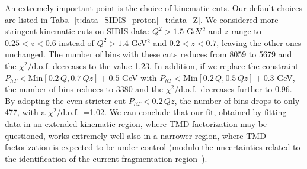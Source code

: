 \documentclass[aps,preprintnumbers,showpacs,nofootinbib,superscriptaddress,floatfix]{revtex4}
\newcommand{\AS}[1]{{\textcolor[rgb]{1,0,1}{#1}}}
\newcommand{\compass}{\textsc{Compass}}
\begin{document}
An extremely important point is the choice of kinematic cuts. Our default
choices are listed in Tabs.~\ref{t:data_SIDIS_proton}--\ref{t:data_Z}. We
considered more stringent kinematic cuts on SIDIS data: 
$Q^2 > 1.5$ GeV$^2$ and $z$ range to 
$0.25 < z < 0.6$ instead of $Q^2 > 1.4$ GeV$^2$ and $0.2 < z <
0.7$, leaving the other ones unchanged. The number of bins with these cuts 
reduces from 8059 to 5679 and 
the  $\chi^2/ \text{d.o.f.}$  decreases to the
value 1.23. 
In addition, if we replace the constraint  $P_{h T} < \text{Min} [
0.2\, Q, 0.7\, Q z] + 0.5$ GeV  
with $P_{h T} < \text{Min} [ 0.2\, Q, 0.5\, Q z] +
0.3$ GeV, the number of bins reduces to 3380 and the $\chi^2/$d.o.f.\ decreases
further to 0.96. By adopting the even stricter 
cut $P_{h T} < 0.2\, Q z$, 
the number of bins drops to only 477, with  a 
 $\chi^2$/d.o.f.\ =1.02.  We can conclude that our fit, obtained by
 fitting data in an extended kinematic region, where TMD factorization may be
 questioned,  works extremely well also in a narrower
 region, where TMD factorization is expected to be under control \AS{(modulo the uncertainties related to the identification of the current fragmentation region~\cite{Boglione:2016bph})}.


%
%
\end{document}
